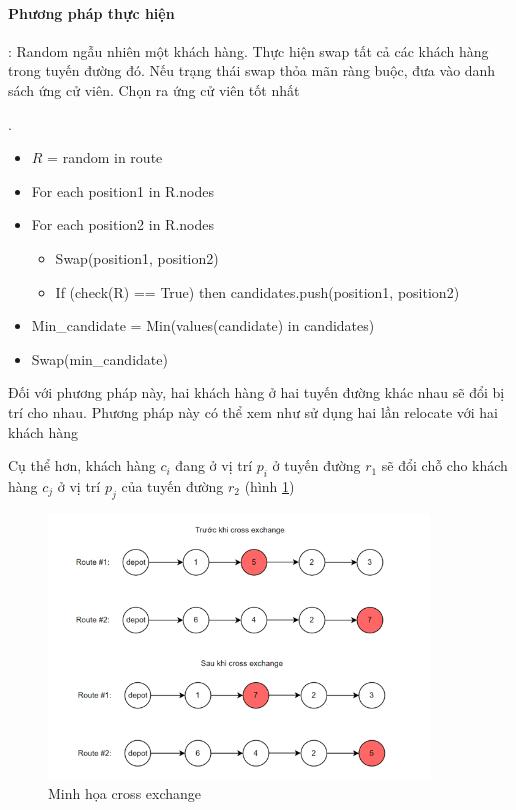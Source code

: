 \documentclass[12pt,a4paper]{article}\author{Nguyễn Nho Dũng}
\begin{document}
\paragraph{Phương pháp thực hiện}: Random ngẫu nhiên một khách hàng. Thực hiện swap tất cả các khách hàng trong tuyến đường đó. Nếu trạng thái swap thỏa mãn ràng buộc, đưa vào danh sách ứng cử viên. Chọn ra ứng cử viên tốt nhất
\begin{thuattoan}
	.
	\begin{itemize}
		\item $R$ = random in route
		\item For each position1 in R.nodes
		\item For each position2 in R.nodes
		\begin{itemize}
			\item Swap(position1, position2)
			\item If (check(R) == True) then candidates.push(position1, position2)
		\end{itemize}
		\item Min\_candidate = Min(values(candidate) in candidates)
		\item Swap(min\_candidate)
	\end{itemize}
\end{thuattoan}
\begin{pphap}
	Đối với phương pháp này, hai khách hàng ở hai tuyến đường khác nhau sẽ đổi bị trí cho nhau. Phương pháp này có thể xem như sử dụng hai lần relocate với hai khách hàng
\end{pphap}
Cụ thể hơn, khách hàng $c_i$ đang ở vị trí $p_i$ ở tuyến đường $r_1$ sẽ đổi chỗ cho khách hàng $c_j$ ở vị trí $p_j$ của tuyến đường $r_2$ (hình \ref{cross_exchange})
\begin{figure}[H]
	\centering
	\includegraphics[width=0.9\textwidth]{Anh/cross_exchange}
	\caption{Minh họa cross exchange}
	\label{cross_exchange}
\end{figure}
\end{document}
